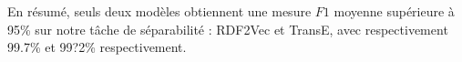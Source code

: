 
En résumé, seuls deux modèles obtiennent une mesure $F1$ moyenne supérieure à 95\% sur notre tâche de séparabilité : RDF2Vec et TransE, avec respectivement 99.7\% et 99?2\% respectivement. 
